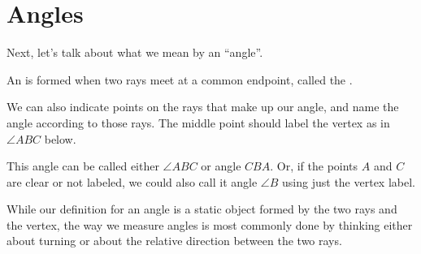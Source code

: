 \documentclass{ximera}
\begin{document}
\section{Angles}

Next, let's talk about what we mean by an ``angle''.

\begin{definition}
An   is formed when two rays meet at a common endpoint, called the .
\begin{image}
\end{image}
\end{definition}

%
%
%
%

We can also indicate points on the rays that make up our angle, and name the angle according to those rays. The middle point should label the vertex as in $\angle ABC$ below.
\begin{image}
\end{image}
This angle can be called either $\angle ABC$ or angle $CBA$. Or, if the points $A$ and $C$ are clear or not labeled, we could also call it angle $\angle B$ using just the vertex label.

While our definition for an angle is a static object formed by the two rays and the vertex, the way we measure angles is most commonly done by thinking either about turning or about the relative direction between the two rays.
\end{document}
